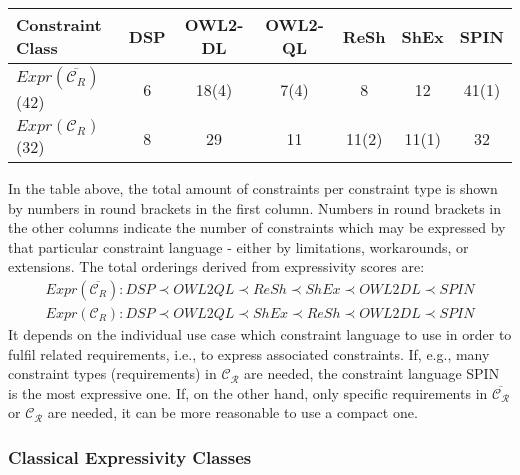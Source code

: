 \documentclass{llncs}
\newcommand{\tb}[1]{\todo[size=\small, color=green!40]{\textbf{Thomas:} #1}}
\newcommand{\er}[1]{\todo[size=\small, color=red!40]{\textbf{Erman:} #1}}
\newenvironment{evaluation}{
  \begin{tabular}{l|c|c|c|c|c|c}
  \hline
  \textbf{Constraint Class} & \textbf{DSP} & \textbf{OWL2-DL} & \textbf{OWL2-QL} & \textbf{ReSh} & \textbf{ShEx} & \textbf{SPIN} \\
  \hline

}{
  \hline
  \end{tabular}
  \linebreak
}
\begin{document}
\begin{center}
\begin{evaluation}
$Expr(\overline{\mathcal{C}_R})$ (42) & 6 & 18(4) & 7(4) & 8 & 12 & 41(1)\\
$Expr(\mathcal{C}_R)$ (32) & 8 & 29 & 11 & 11(2) & 11(1) & 32 \\ 
\end{evaluation}
\end{center}
In the table above, the total amount of constraints per constraint type is shown by numbers in round brackets in the first column.
Numbers in round brackets in the other columns indicate the number of constraints which may be expressed by that particular constraint language - either by limitations, workarounds, or extensions.  
The total orderings derived from expressivity scores are:
\begin{eqnarray*}
Expr(\overline{\mathcal{C}_R}): DSP \prec OWL2QL \prec ReSh \prec ShEx \prec OWL2DL \prec SPIN \\
Expr(\mathcal{C}_R): DSP \prec OWL2QL \prec ShEx \prec ReSh \prec OWL2DL \prec SPIN
\end{eqnarray*}
It depends on the individual use case which constraint language to use in order to fulfil related requirements, i.e., to express associated constraints.
If, e.g., many constraint types (requirements) in $\mathcal{C_R}$ are needed, the constraint language SPIN is the most expressive one.
If, on the other hand, only specific requirements in $\overline{\mathcal{C_R}}$ or $\mathcal{C_R}$ are needed, 
it can be more reasonable to use a compact one.


\subsubsection{Classical Expressivity Classes}
\end{document}
